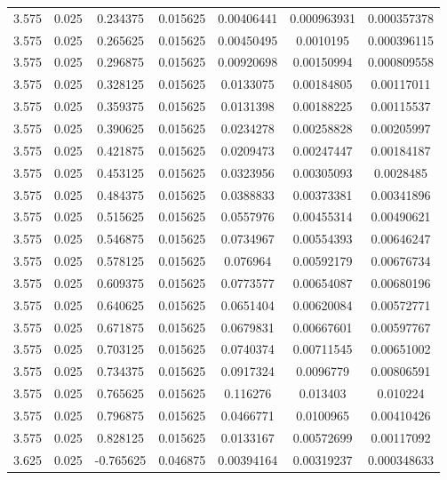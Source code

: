 \begin{table}[bh]
\begin{center}
{\begin{tabular}{ccccccc}
3.575	 & 0.025 & 	0.234375	 & 0.015625	 & 0.00406441	 & 0.000963931	 & 0.000357378 \\ 
3.575	 & 0.025 & 	0.265625	 & 0.015625	 & 0.00450495	 & 0.0010195	 & 0.000396115 \\ 
3.575	 & 0.025 & 	0.296875	 & 0.015625	 & 0.00920698	 & 0.00150994	 & 0.000809558 \\ 
3.575	 & 0.025 & 	0.328125	 & 0.015625	 & 0.0133075	 & 0.00184805	 & 0.00117011 \\ 
3.575	 & 0.025 & 	0.359375	 & 0.015625	 & 0.0131398	 & 0.00188225	 & 0.00115537 \\ 
3.575	 & 0.025 & 	0.390625	 & 0.015625	 & 0.0234278	 & 0.00258828	 & 0.00205997 \\ 
3.575	 & 0.025 & 	0.421875	 & 0.015625	 & 0.0209473	 & 0.00247447	 & 0.00184187 \\ 
3.575	 & 0.025 & 	0.453125	 & 0.015625	 & 0.0323956	 & 0.00305093	 & 0.0028485 \\ 
3.575	 & 0.025 & 	0.484375	 & 0.015625	 & 0.0388833	 & 0.00373381	 & 0.00341896 \\ 
3.575	 & 0.025 & 	0.515625	 & 0.015625	 & 0.0557976	 & 0.00455314	 & 0.00490621 \\ 
3.575	 & 0.025 & 	0.546875	 & 0.015625	 & 0.0734967	 & 0.00554393	 & 0.00646247 \\ 
3.575	 & 0.025 & 	0.578125	 & 0.015625	 & 0.076964	 & 0.00592179	 & 0.00676734 \\ 
3.575	 & 0.025 & 	0.609375	 & 0.015625	 & 0.0773577	 & 0.00654087	 & 0.00680196 \\ 
3.575	 & 0.025 & 	0.640625	 & 0.015625	 & 0.0651404	 & 0.00620084	 & 0.00572771 \\ 
3.575	 & 0.025 & 	0.671875	 & 0.015625	 & 0.0679831	 & 0.00667601	 & 0.00597767 \\ 
3.575	 & 0.025 & 	0.703125	 & 0.015625	 & 0.0740374	 & 0.00711545	 & 0.00651002 \\ 
3.575	 & 0.025 & 	0.734375	 & 0.015625	 & 0.0917324	 & 0.0096779	 & 0.00806591 \\ 
3.575	 & 0.025 & 	0.765625	 & 0.015625	 & 0.116276	 & 0.013403	 & 0.010224 \\ 
3.575	 & 0.025 & 	0.796875	 & 0.015625	 & 0.0466771	 & 0.0100965	 & 0.00410426 \\ 
3.575	 & 0.025 & 	0.828125	 & 0.015625	 & 0.0133167	 & 0.00572699	 & 0.00117092 \\ 
3.625	 & 0.025 & 	-0.765625	 & 0.046875	 & 0.00394164	 & 0.00319237	 & 0.000348633 \\ 

\end{tabular}}
\end{center}
\end{table}
